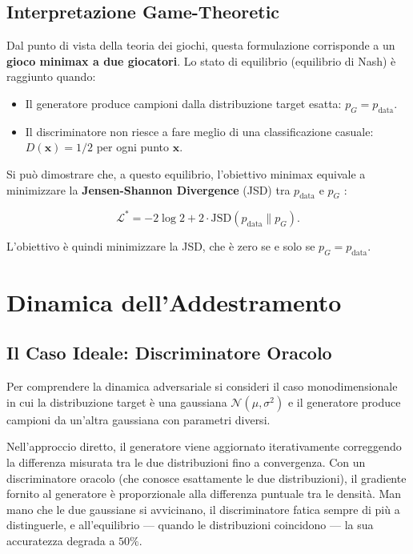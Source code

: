 \subsection{Interpretazione Game-Theoretic}
\label{subsec:gan-game-theory}

Dal punto di vista della teoria dei giochi, questa formulazione
corrisponde a un \textbf{gioco minimax a due giocatori}. Lo stato di
equilibrio (equilibrio di Nash) è raggiunto quando:

\begin{itemize}
  \item Il generatore produce campioni dalla distribuzione target esatta:
        $p_G = p_{\text{data}}$.
  \item Il discriminatore non riesce a fare meglio di una classificazione
        casuale: $D(\mathbf{x}) = 1/2$ per ogni punto $\mathbf{x}$.
\end{itemize}

Si può dimostrare che, a questo equilibrio, l'obiettivo minimax
equivale a minimizzare la \textbf{Jensen-Shannon Divergence} (JSD) tra
$p_{\text{data}}$ e $p_G$ \citep{bishop2024}:

\begin{equation}
  \mathcal{L}^* = -2\log 2
    + 2 \cdot \mathrm{JSD}(p_{\text{data}} \| p_G).
  \label{eq:gan-jsd}
\end{equation}

L'obiettivo è quindi minimizzare la JSD, che è zero se e solo se
$p_G = p_{\text{data}}$.

\section{Dinamica dell'Addestramento}
\label{sec:gan-training}

\subsection{Il Caso Ideale: Discriminatore Oracolo}
\label{subsec:gan-ideal-case}

Per comprendere la dinamica adversariale si consideri il caso
monodimensionale in cui la distribuzione target è una gaussiana
$\mathcal{N}(\mu, \sigma^2)$ e il generatore produce campioni da
un'altra gaussiana con parametri diversi.

Nell'approccio diretto, il generatore viene aggiornato
iterativamente correggendo la differenza misurata tra le due
distribuzioni fino a convergenza. Con un discriminatore oracolo (che
conosce esattamente le due distribuzioni), il gradiente fornito al
generatore è proporzionale alla differenza puntuale tra le densità.
Man mano che le due gaussiane si avvicinano, il discriminatore fatica
sempre di più a distinguerle, e all'equilibrio --- quando le
distribuzioni coincidono --- la sua accuratezza degrada a $50\%$.

